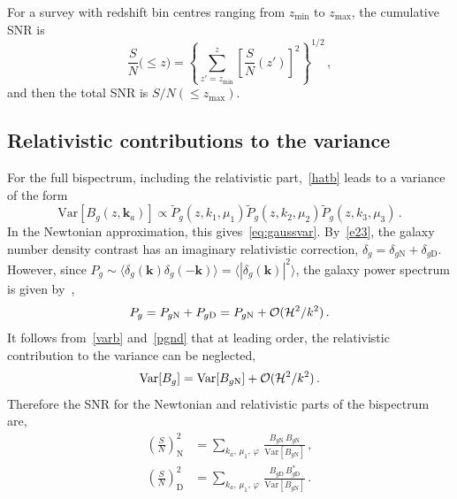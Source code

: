 For a survey with redshift bin centres ranging from $z_{\mathrm{min}}$ to $z_{\mathrm{max}}$,  the cumulative SNR  is
\begin{equation} \label{csnr}
\frac{S}{N}\big(\leq z\big) = \left\{\sum_{z'=z_{\mathrm{min}}}^z \left[\frac{S}{N}(z')\right]^{2} \right\}^{1/2}\,,
\end{equation}
and then the total SNR is $S/N(\leq z_{\mathrm{max}})$.
%

\subsection{Relativistic contributions to the variance}
%
%
For the full bispectrum, including the relativistic part,~\eqref{hatb} leads to a variance of the form 
\begin{equation} \label{varb}
\mathrm{Var} [{B_{g}}(z,\bm{k}_a)] \propto \tilde{P}_{g}(z,k_{1},\mu_{1}) \tilde{P}_{g}(z,k_{2},\mu_{2})\tilde{P}_{g}(z,k_{3},\mu_{3}) \,.
\end{equation}
In the Newtonian approximation, this gives~\eqref{eq:gaussvar}. By~\eqref{e23}, the galaxy number density contrast has an imaginary relativistic correction, $\delta_g=\delta_{g\mathrm{N}} + \delta_{g\mathrm{D}}$. However, since $P_g \sim\langle \delta_g(\bm{k}) \delta_g(\bm{-k})\rangle =\langle |\delta_g(\bm{k})|^2\rangle$, the galaxy power spectrum is given by~\cite{McDonald:2009dh,Abramo:2017xnp,Clarkson:2018dwn},
\begin{equation} \label{pgnd}
P_g = P_{g\mathrm{N}} + P_{g \mathrm{D}} =  P_{g \mathrm{N}} + \mathcal{O}(\mathcal{H}^2/k^2)\,.
\end{equation}
It follows from~\eqref{varb} and~\eqref{pgnd} that at leading order, the relativistic contribution to the variance can be neglected,
\begin{equation}
\mathrm{Var} [{B_{g}}] = \mathrm{Var} [B_{g\mathrm{N}}] + \mathcal{O}(\mathcal{H}^2/k^2)\,.
\end{equation}
Therefore the SNR for the Newtonian and relativistic parts of the bispectrum are,
\begin{align}
\left(\frac{S}{N}\right)^2_\mathrm{N} &= 
\sum_{k_a,\,\mu_{1},\,\varphi}\, \frac{B_{g \mathrm{N}}\,B_{g\mathrm{N}}}{\mathrm{Var} [B_{g \mathrm{N}}] }\,,\label{e3a}\\
\left(\frac{S}{N}\right)^{2}_\mathrm{D} &= 
\sum_{k_a,\,\mu_{1},\,\varphi} \, \frac{ B_{g \mathrm{D}} \, B^*_{g \mathrm{D}}  }{ \mathrm{Var} [B_{g{\mathrm{N}}}]}\,.\label{e3b}  
\end{align}
%
%
